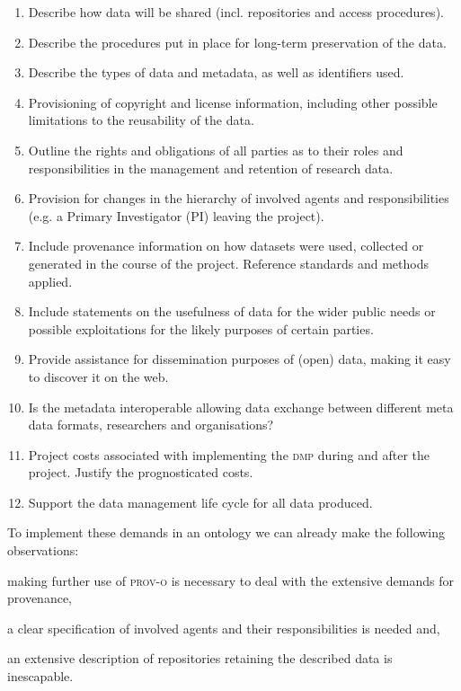 \documentclass[runningheads,a4paper]{llncs}
\newcommand{\prov}{{\scshape prov-o}\xspace}
\newcommand{\dmp}{{\scshape dmp}\xspace}
\begin{document}
\begin{enumerate}
\item Describe how data will be shared (incl. repositories and access procedures). %
\item Describe the procedures put in place for long-term preservation of the data.
\item Describe the types of data and metadata, as well as identifiers used.
\item Provisioning of copyright and license information, including other possible limitations to the reusability of the data.
\item Outline the rights and obligations of all parties as to their roles and responsibilities in the management and retention of research data.
\item Provision for changes in the hierarchy of involved agents and responsibilities (e.g. a Primary Investigator (PI) leaving the project).
\item Include provenance information on how datasets were used, collected or generated in the course of the project. Reference standards and methods applied.
\item Include statements on the usefulness of data for the wider public needs or possible exploitations for the likely purposes of certain parties.
\item Provide assistance for dissemination purposes of (open) data, making it easy to discover it on the web.
\item Is the metadata interoperable allowing data exchange between different meta data formats, researchers and organisations?
\item Project costs associated with implementing the \dmp during and after the project. Justify the prognosticated costs.
\item Support the data management life cycle for all data produced.
\end{enumerate}

To implement these demands in an ontology we can already make the following observations:
\begin{inparaenum}
\item making further use of \prov is necessary to deal with the extensive demands for provenance,
\item a clear specification of involved agents and their responsibilities is needed and,
\item an extensive description of repositories retaining the described data is inescapable.
\end{inparaenum}
\end{document}
